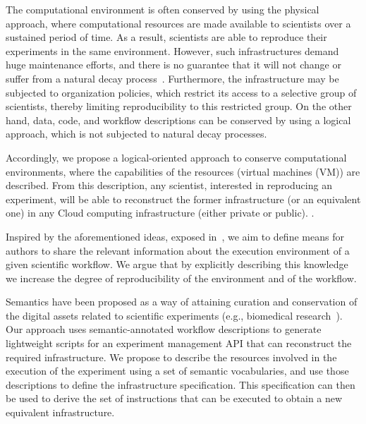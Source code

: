 The computational environment is often conserved by using the physical approach, where 
computational resources are made available to scientists over a sustained period of time. 
As a result, scientists are able to reproduce their experiments in the same environment. 
However, such infrastructures demand huge maintenance efforts, and there is no guarantee 
that it will not change or suffer from a natural decay process~\cite{Gavish2011637}. 
Furthermore, the infrastructure may be subjected to organization policies, which restrict 
its access to a selective group of scientists, thereby limiting reproducibility to this restricted 
group. On the other hand, data, code, and workflow descriptions can be conserved by using 
a logical approach, which is not subjected to natural decay processes.

Accordingly, we propose a logical-oriented approach to conserve computational environments, 
where the capabilities of the resources (virtual machines (VM)) are described. From this 
description, any scientist, interested in reproducing an experiment, will be able to reconstruct 
the former infrastructure (or an equivalent one) in any Cloud computing infrastructure (either 
private or public). . 


Inspired by the aforementioned ideas, exposed in~\cite{King1995}, we aim to  define means 
for authors to share the relevant information about the execution environment of a given scientific
workflow. We argue that by explicitly describing this knowledge we increase the degree of 
reproducibility of the environment and of the workflow.

Semantics have been proposed as a way of attaining curation and conservation of the digital 
assets related to scientific experiments (e.g., biomedical research~\cite{MaloneSWO2014}). 
Our approach uses semantic-annotated workflow descriptions to generate lightweight scripts 
for an experiment management API that can reconstruct the required infrastructure. We 
propose to describe the resources involved in the execution of the experiment using a set of 
semantic vocabularies, and use those descriptions to define the infrastructure specification. 
This specification can then be used to derive the set of instructions that can be executed to 
obtain a new equivalent infrastructure. 

